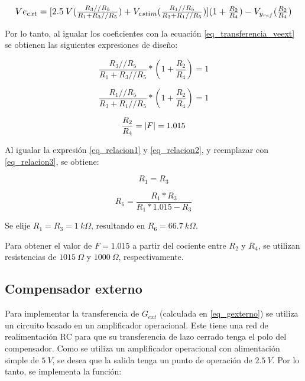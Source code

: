 \begin{equation*}
	\resizebox{.99\hsize}{!}
	{
		$
		Ve_{ext}= [2.5\:V (\frac{R_3//R_5}{R_1+R_3//R_5})+V_{estim}(\frac{R_1//R_5}{R_3+R_1//R_5})](1+\frac{R_2}{R_4})-V_{y_{ref}}(\frac{R_2}{R_4})
		$
	}
\end{equation*}


Por lo tanto, al igualar los coeficientes con la ecuación \ref{eq_transferencia_veext} se obtienen las siguientes expresiones de diseño:


\begin{equation} \label{eq_relacion1}
	\frac{R_3//R_5}{R_1+R_3//R_5}*(1+\frac{R_2}{R_4})=1
\end{equation}

\begin{equation} \label{eq_relacion2}
	\frac{R_1//R_5}{R_3+R_1//R_5}*(1+\frac{R_2}{R_4})=1
\end{equation}

\begin{equation} \label{eq_relacion3} 
	\frac{R_2}{R_4}=\lvert F\rvert=1.015
\end{equation}

Al igualar la expresión \ref{eq_relacion1} y \ref{eq_relacion2}, y reemplazar con \ref{eq_relacion3}, se obtiene:

\begin{equation*} 
	R_1 = R_3
\end{equation*}

\begin{equation*} 
	R_6=\frac{R_1*R_3}{R_1*1.015-R_3}
\end{equation*}

Se elije $R_1=R_3=1\:k\Omega$, resultando en $R_6=66.7\:k\Omega$.

Para obtener el valor de $F=1.015$ a partir del cociente entre  $R_2$  y $R_4$, se utilizan resistencias de $1015\:\Omega$ y $1000\:\Omega$, respectivamente.

\subsection{Compensador externo}

Para implementar la transferencia de $G_{ext}$ (calculada en \ref{eq_gexterno}) se utiliza un circuito basado en un amplificador operacional. Este tiene una red de realimentación RC para que su transferencia de lazo cerrado tenga el polo del compensador. Como se utiliza un amplificador operacional con alimentación simple de $5\:V$, se desea que la salida tenga un punto de operación de $2.5\:V$. Por lo tanto, se implementa la función:


